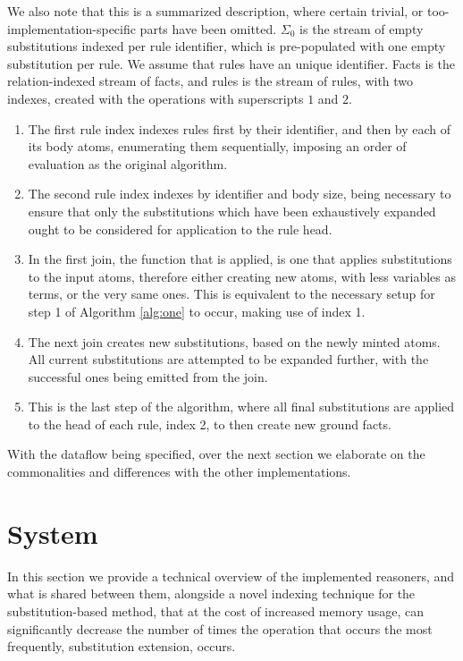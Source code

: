 \documentclass[sigconf,screen,review=false,natbib]{acmart}
\theoremstyle{definition}
\begin{document}
We also note that this is a summarized description, where certain trivial, or too-implementation-specific parts
have been omitted. $\Sigma_0$ is the stream of empty substitutions indexed per rule identifier, which is pre-populated
with one empty substitution per rule. We assume that rules have an unique identifier. Facts is the relation-indexed
stream of facts, and rules is the stream of rules, with two indexes, created with the operations with superscripts $1$ and $2$.
\begin{enumerate}
	\item The first rule index indexes rules first by their identifier, and then by each of its body atoms, enumerating
	      them sequentially, imposing an order of evaluation as the original algorithm.
	\item The second rule index indexes by identifier and body size, being necessary to ensure that only the substitutions
	      which have been exhaustively expanded ought to be considered for application to the rule head.
	\item In the first join, the function that is applied, is one that applies substitutions to the input atoms, therefore either creating new
	      atoms, with less variables as terms, or the very same ones. This is equivalent to the necessary setup for step 1
	      of Algorithm \ref{alg:one} to occur, making use of index 1.
	\item The next join creates new substitutions, based on the newly minted atoms. All current substitutions are attempted
	      to be expanded further, with the successful ones being emitted from the join.
	\item This is the last step of the algorithm, where all final substitutions are applied to the head of each rule, index
	      2, to then create new ground facts.
\end{enumerate}
With the dataflow being specified, over the next section we elaborate on the commonalities and differences with the other implementations.
\section{System}
In this section we provide a technical overview of the implemented reasoners, and what is shared between them, alongside
a novel indexing technique for the substitution-based method, that at the cost of increased memory usage, can significantly
decrease the number of times the operation that occurs the most frequently, substitution extension, occurs.
\end{document}
